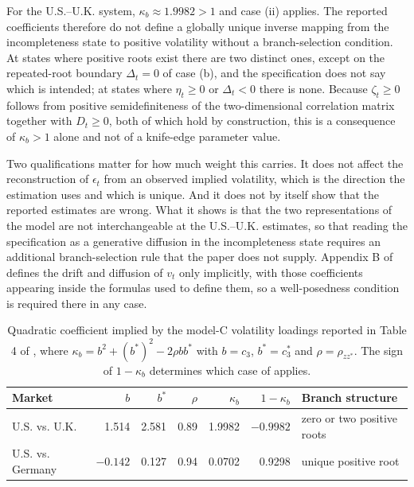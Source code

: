 \documentclass[11pt]{article}
\theoremstyle{definition}
\begin{document}
For the U.S.--U.K. system, $\kappa_b\approx1.9982>1$ and case (ii) applies. The reported coefficients therefore do not define a globally unique inverse mapping from the incompleteness state to positive volatility without a branch-selection condition. At states where positive roots exist there are two distinct ones, except on the repeated-root boundary $\Delta_t=0$ of case (b), and the specification does not say which is intended; at states where $\eta_t\ge0$ or $\Delta_t<0$ there is none. Because $\zeta_t\ge0$ follows from positive semidefiniteness of the two-dimensional correlation matrix together with $D_t\ge0$, both of which hold by construction, this is a consequence of $\kappa_b>1$ alone and not of a knife-edge parameter value.

Two qualifications matter for how much weight this carries. It does not affect the reconstruction of $\epsilon_t$ from an observed implied volatility, which is the direction the estimation uses and which is unique. And it does not by itself show that the reported estimates are wrong. What it shows is that the two representations of the model are not interchangeable at the U.S.--U.K. estimates, so that reading the specification as a generative diffusion in the incompleteness state requires an additional branch-selection rule that the paper does not supply. Appendix B of \citet{BrandtSantaClara2002} defines the drift and diffusion of $v_t$ only implicitly, with those coefficients appearing inside the formulas used to define them, so a well-posedness condition is required there in any case.

\begin{table}[htbp]
\centering
\caption{Quadratic coefficient implied by the model-C volatility loadings reported in Table 4 of \citet{BrandtSantaClara2002}, where $\kappa_b=b^2+(b^*)^2-2\rho bb^*$ with $b=c_3$, $b^*=c_3^*$ and $\rho=\rho_{zz^*}$. The sign of $1-\kappa_b$ determines which case of  applies.}
\label{tab:implicit_coefficients}
\begin{tabular}{lrrrrrl}
\toprule
Market & $b$ & $b^*$ & $\rho$ & $\kappa_b$ & $1-\kappa_b$ & Branch structure \\
\midrule
U.S. vs. U.K. & 1.514 & 2.581 & 0.89 & 1.9982 & $-0.9982$ & zero or two positive roots \\
U.S. vs. Germany & $-0.142$ & 0.127 & 0.94 & 0.0702 & 0.9298 & unique positive root \\
\bottomrule
\end{tabular}
\end{table}
\end{document}
